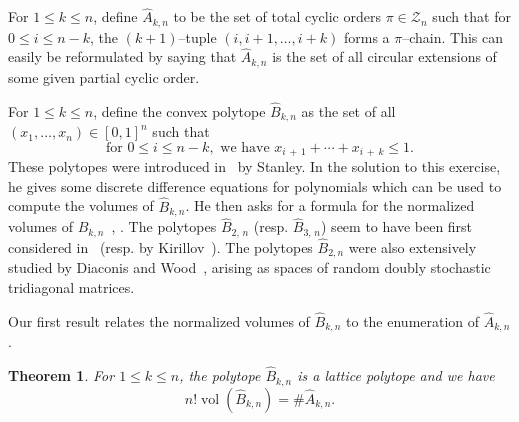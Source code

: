 \documentclass[11pt]{article}
\newtheorem{theo}{Theorem}[section]
\theoremstyle{definition}
\numberwithin{equation}{section}
\numberwithin{figure}{section}
\numberwithin{table}{section}
\DeclareMathOperator{\vol}{vol}
\newcommand{\calZ}{\mathcal Z}
\newcommand*{\MK}{\mkern 2mu}
\begin{document}
For $1\leq k \leq n$, define $\hat{A}_{k,n}$ to be the set of total cyclic orders $\pi\in\calZ_n$ such that for $0\leq i \leq n-k$, the $(k+1)$--tuple $(i,i+1,\ldots,i+k)$ forms a $\pi$--chain. This can easily be reformulated by saying that $\hat{A}_{k,n}$ is the set of all circular extensions of some given partial cyclic order.

For $1\leq k\leq n$, define the convex polytope $\hat{B}_{k,n}$ as the set of all $(x_1,\ldots,x_n)\in[0,1]^n$ such that
\[
\text{for } 0 \leq i \leq n-k, \text{ we have } x_{i\,+\,1} + \cdots + x_{i\,+\,k}\leq 1.
\]
These polytopes were introduced in~\cite[Exercise~4.56$\MK$(c)]{S12} by Stanley. In the solution to this exercise, he gives some discrete difference equations for polynomials which can be used to compute the volumes of $\hat{B}_{k,n}$. He then asks for a formula for the normalized volumes of $\hat{B}_{k,n}$~\cite{stanley-2012}, \cite[Exercise~4.56$\MK$(d)]{S12}. The polytopes $\hat{B}_{2,\,n}$ (resp. $\hat{B}_{3,\,n}$) seem to have been first considered in~\cite{SMN79} (resp. by Kirillov~\cite[Sequence A096402]{OEIS}). The polytopes $\hat{B}_{2,n}$ were also extensively studied by Diaconis and Wood~\cite{DW13}, arising as spaces of random doubly stochastic tridiagonal matrices.

Our first result relates the normalized volumes of $\hat{B}_{k,n}$ to the enumeration of $\hat{A}_{k,n}$.

\begin{theo}\label{thm:Stanleyvolumes}
For $1\leq k\leq n$, the polytope $\hat{B}_{k,n}$ is a lattice polytope and we have
\begin{equation}
n! \vol(\hat{B}_{k,n}) = \# \hat{A}_{k,n}.
\end{equation}
\end{theo}
\end{document}
